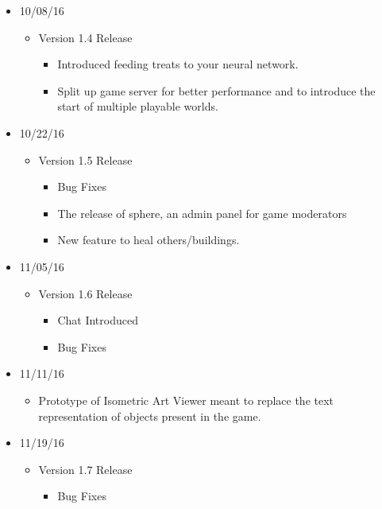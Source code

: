 \documentclass[11pt]{article}
\begin{document}
\begin{itemize}
	\item 10/08/16
		\begin{itemize}
			\item Version 1.4 Release
				\begin{itemize}
					\item Introduced feeding treats to your neural network.
					\item Split up game server for better performance and to introduce the start of multiple playable worlds.
				\end{itemize}
		\end{itemize}
	\item 10/22/16
		\begin{itemize}
			\item Version 1.5 Release
				\begin{itemize}
					\item Bug Fixes
					\item The release of sphere, an admin panel for game moderators
					\item New feature to heal others/buildings.
				\end{itemize}
		\end{itemize}
	\item 11/05/16
		\begin{itemize}
			\item Version 1.6 Release
				\begin{itemize}
					\item Chat Introduced
					\item Bug Fixes
				\end{itemize}
		\end{itemize}
	\item 11/11/16
		\begin{itemize}
			\item Prototype of Isometric Art Viewer meant to replace the text representation of objects present in the game.
		\end{itemize}
	\item 11/19/16
		\begin{itemize}
			\item Version 1.7 Release
				\begin{itemize}
					\item Bug Fixes
				\end{itemize}
		\end{itemize}
\end{itemize}
\end{document}
